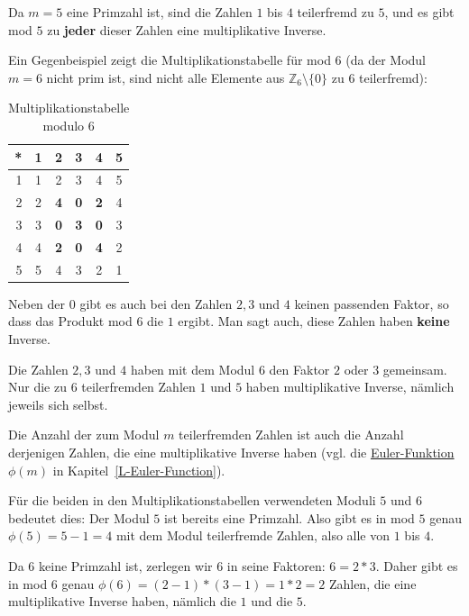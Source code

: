 \begin{refsegment}
Da $m=5$ eine Primzahl ist, sind die Zahlen $1$ bis $4$ teilerfremd zu $5$, und
es gibt mod $5$ zu \textbf{jeder} dieser Zahlen eine multiplikative Inverse.

Ein Gegenbeispiel zeigt die Multiplikationstabelle für mod $6$
(da der Modul $m = 6$ nicht prim ist, sind nicht alle Elemente aus
$\mathbb{Z}_6\setminus \{0\}$ zu $6$ teilerfremd):

\begin{table}[ht]
\begin{center}
\begin{tabular}{r|ccccc}
* &  1 & 2 & 3 & 4 & 5\\
\hline
1 &  1 & 2 & 3 & 4 & 5\\
2 &  2 & \textbf{4} & \textbf{0} & \textbf{2} & 4\\
3 &  3 & \textbf{0} & \textbf{3} & \textbf{0} & 3\\
4 &  4 & \textbf{2} & \textbf{0} & \textbf{4} & 2\\
5 &  5 & 4 & 3 & 2 & 1\\
\end{tabular}
\end{center}
\caption{Multiplikationstabelle modulo $6$}
\label{mulmod6}
\end{table}


Neben der $0$ gibt es auch bei den Zahlen $2, 3$ und $4$ keinen passenden Faktor,
so dass das Produkt mod $6$ die $1$ ergibt. Man sagt auch, diese Zahlen haben
\textbf{keine} Inverse.%

Die Zahlen $2, 3$ und $4$ haben mit dem Modul $6$ den Faktor $2$ oder $3$
gemeinsam.
Nur die zu $6$ teilerfremden Zahlen
$1$ und $5$ haben multiplikative Inverse, nämlich jeweils sich selbst.

Die Anzahl der zum Modul $m$ teilerfremden Zahlen ist auch die Anzahl
derjenigen Zahlen, die eine multiplikative Inverse haben (vgl. die
\hyperlink{EulerFunction}{Euler-Funktion} 
$\phi(m)$ in Kapitel~\ref{L-Euler-Function}).

Für die beiden in den Multiplikationstabellen verwendeten Moduli $5$ und $6$
bedeutet dies:
Der Modul $5$ ist bereits eine Primzahl. Also gibt es in mod $5$ genau $\phi(5) = 5 - 1 = 4$
mit dem Modul teilerfremde Zahlen, also alle von $1$ bis $4$.

Da $6$ keine Primzahl ist, zerlegen wir $6$ in seine Faktoren: $6 = 2 * 3$.
Daher gibt es in mod $6$ genau $\phi(6) = (2-1)*(3-1) = 1 * 2 = 2$ Zahlen, die eine
multiplikative Inverse haben, nämlich die $1$ und die $5$.


\end{refsegment}
